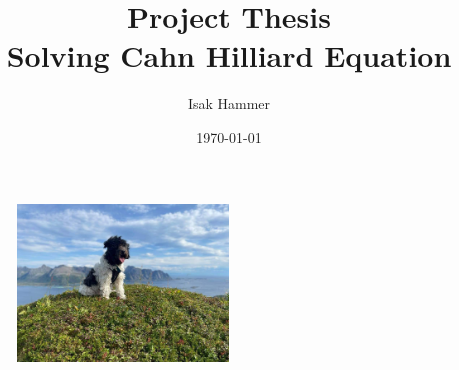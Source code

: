 \documentclass{article}
\title{Project Thesis\\ Solving Cahn Hilliard Equation}
\author{Isak Hammer }
\date{\today}
\begin{document}
    \begin{titlepage}
        \maketitle
        \begin{figure}
        \centering
        \includegraphics[width=0.5\textwidth]{figures/front_page/molly.jpeg}\\
        \end{figure}
        \thispagestyle{empty}
    \end{titlepage}

    \newpage
    \label{sec:eyyy}


    
    
    
    
    

    \printbibliography
\end{document}

